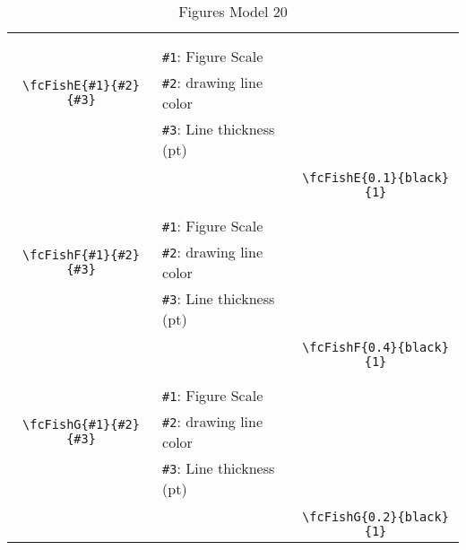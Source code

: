 \documentclass[x11names]{article}
\begin{document}
\begin{table}[H]
\begin{tabular}{|c|l|c|}
	&&\multirow{5}{*}{\fcFishE{0.1}{black}{1}}\\	&&\\	&\verb|#1|: Figure Scale &\\	\verb|\fcFishE{#1}{#2}{#3}|&	\verb|#2|: drawing line color &\\	&\verb|#3|: Line thickness (pt) &\\ &&\\&&	\verb|\fcFishE{0.1}{black}{1}|\\\hline 	
	&&\multirow{5}{*}{\fcFishF{0.4}{black}{1}}\\	&&\\	&\verb|#1|: Figure Scale &\\	\verb|\fcFishF{#1}{#2}{#3}|&	\verb|#2|: drawing line color &\\	&\verb|#3|: Line thickness (pt) &\\ &&\\&&	\verb|\fcFishF{0.4}{black}{1}|\\\hline 	
	&&\multirow{5}{*}{\fcFishG{0.2}{black}{1}}\\	&&\\	&\verb|#1|: Figure Scale &\\	\verb|\fcFishG{#1}{#2}{#3}|&	\verb|#2|: drawing line color &\\	&\verb|#3|: Line thickness (pt) &\\ &&\\&&	\verb|\fcFishG{0.2}{black}{1}|\\\hline 	\hline\end{tabular}\caption{Figures Model 20}\label{tab20}\end{table}
\end{document}
